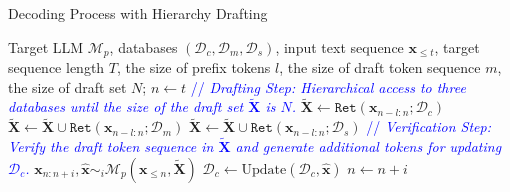 \setlength{\textfloatsep}{1em}%

\begin{algorithm}[t!]
\caption{\small Decoding Process with Hierarchy Drafting}\label{alg:HD_process}
\small
\begin{algorithmic}[1]
\Require Target LLM $\mathcal{M}_p$, databases $(\mathcal{D}_c, \mathcal{D}_m, \mathcal{D}_s)$, input text sequence $\bm{x}_{\le t}$, target sequence length $T$, the size of prefix tokens $l$, the size of draft token sequence $m$, the size of draft set $N$;
\State $n \leftarrow t$\;
    \State \textcolor{blue}{// \textit{Drafting Step: Hierarchical access to three databases until the size of the draft set $\bm{\tilde{X}}$ is $N$.}}
    \State $\bm{\tilde{X}} \leftarrow \texttt{Ret}(\bm{x}_{n-l:n};\mathcal{D}_c)$
        \State $\bm{\tilde{X}} \leftarrow \bm{\tilde{X}} \cup \texttt{Ret}(\bm{x}_{n-l:n};\mathcal{D}_m)$
    \EndIf 
        \State $\bm{\tilde{X}} \leftarrow \bm{\tilde{X}} \cup \texttt{Ret}(\bm{x}_{n-l:n};\mathcal{D}_s)$
    \EndIf 
    \State \textcolor{blue}{// \textit{Verification Step: Verify the draft token sequence in $\bm{\tilde{X}}$ and generate additional tokens for updating $\mathcal{D}_c$.}}
    \State $\bm{x}_{n:n+i}, \bm{\hat{x}} \sim_i \mathcal{M}_p(\bm{x}_{\le n}, \bm{\tilde{X}})$
    \State $\mathcal{D}_c \leftarrow \text{Update}(\mathcal{D}_c, \bm{\hat{x}})$
    \State $n \gets n+i$
\EndWhile
\end{algorithmic}
\end{algorithm}
